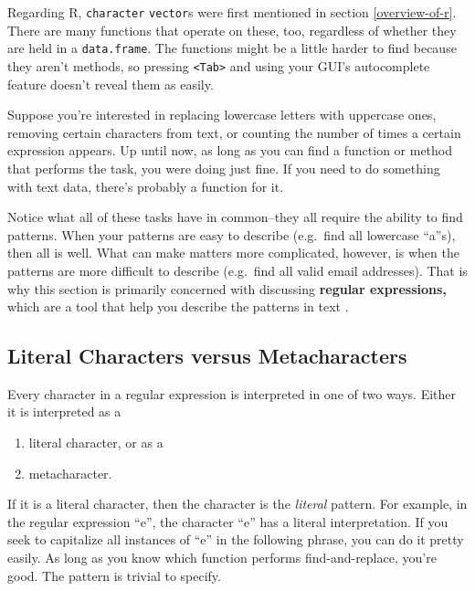\documentclass[12pt,krantz2]{krantz}
\providecommand{\tightlist}{%
  \setlength{\itemsep}{0pt}\setlength{\parskip}{0pt}}
\begin{document}
Regarding R, \texttt{character} \texttt{vector}s were first mentioned in section \ref{overview-of-r}. There are many functions that operate on these, too, regardless of whether they are held in a \texttt{data.frame}. The functions might be a little harder to find because they aren't methods, so pressing \texttt{\textless{}Tab\textgreater{}} and using your GUI's autocomplete feature doesn't reveal them as easily.

Suppose you're interested in replacing lowercase letters with uppercase ones, removing certain characters from text, or counting the number of times a certain expression appears. Up until now, as long as you can find a function or method that performs the task, you were doing just fine. If you need to do something with text data, there's probably a function for it.

Notice what all of these tasks have in common--they all require the ability to find patterns. When your patterns are easy to describe (e.g.~find all lowercase ``a''s), then all is well. What can make matters more complicated, however, is when the patterns are more difficult to describe (e.g.~find all valid email addresses). That is why this section is primarily concerned with discussing \textbf{regular expressions,} which are a tool that help you describe the patterns in text \citep{rfords} \citep{pythonregexprs}.

\hypertarget{literal-characters-versus-metacharacters}{%
\subsection{Literal Characters versus Metacharacters}\label{literal-characters-versus-metacharacters}}

Every character in a regular expression is interpreted in one of two ways. Either it is interpreted as a

\begin{enumerate}
\def\labelenumi{\arabic{enumi}.}
\tightlist
\item
  literal character, or as a
\item
  metacharacter.
\end{enumerate}

If it is a literal character, then the character is the \emph{literal} pattern. For example, in the regular expression ``e'', the character ``e'' has a literal interpretation. If you seek to capitalize all instances of ``e'' in the following phrase, you can do it pretty easily. As long as you know which function performs find-and-replace, you're good. The pattern is trivial to specify.
\end{document}
